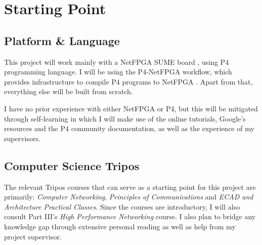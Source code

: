 \section*{\fontsize{18pt}{0.5}\selectfont Starting Point}

\subsection*{Platform \& Language}
This project will work mainly with a NetFPGA SUME board \cite{zilberman2014netfpga}, using P4 programming language. I will be using the P4-NetFPGA workflow, which provides infrastructure to compile P4 programs to NetFPGA \cite{fpga}. Apart from that, everything else will be built from scratch.

I have no prior experience with either NetFPGA or P4, but this will be mitigated through self-learning in which I will make use of the online tutorials, Google's resources and the P4 community documentation, as well as the experience of my supervisors. 

\subsection*{Computer Science Tripos}
The relevant Tripos courses that can serve as a starting point for this project are primarily: \emph{Computer Networking}, \emph{Principles of Communications} and \emph{ECAD and Architecture Practical Classes}. Since the courses are introductory, I will also consult Part III's \emph{High Performance Networking} course. I also plan to bridge any knowledge gap through extensive personal reading as well as help from my project supervisor.
